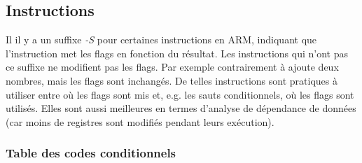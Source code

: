 \subsection{Instructions}


Il il y a un suffixe \emph{-S}  pour certaines instructions en ARM, indiquant que
l'instruction met les flags en fonction du résultat.
Les instructions qui n'ont pas ce suffixe ne modifient pas les flags.
Par exemple  contrairement à 
ajoute deux nombres, mais les flags sont inchangés.
De telles instructions sont pratiques à utiliser entre \CMP où les flags sont mis et, e.g.
les sauts conditionnels, où les flags sont utilisés.
Elles sont aussi meilleures en termes d'analyse de dépendance de données (car moins
de registres sont modifiés pendant leurs exécution).



\subsubsection{Table des codes conditionnels}

